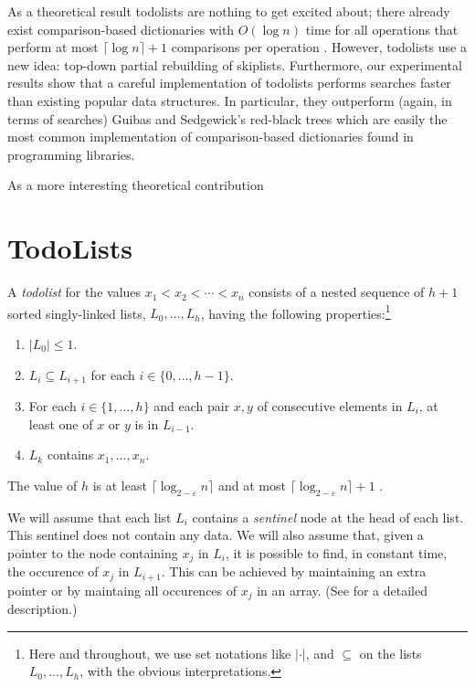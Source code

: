 \documentclass[lotsofwhite]{patmorin}
\begin{document}
As a theoretical result todolists are nothing to get excited about; there
already exist comparison-based dictionaries with $O(\log n)$ time for
all operations that perform at most $\lceil\log n\rceil+1$ comparisons
per operation \cite{S}. However, todolists use a new idea: top-down
partial rebuilding of skiplists.  Furthermore, our experimental results
show that a careful implementation of todolists performs searches faster
than existing popular data structures.  In particular, they outperform
(again, in terms of searches) Guibas and Sedgewick's red-black trees
which are easily the most common implementation of comparison-based
dictionaries found in programming libraries.

As a more interesting theoretical contribution



\section{TodoLists}

A \emph{todolist} for the values $x_1<x_2<\cdots<x_n$ consists of a
nested sequence of $h+1$ sorted singly-linked lists, $L_0,\ldots,L_h$,
having the following properties:\footnote{Here and throughout, we use set
notations like $|\cdot|$, and $\subseteq$ on the lists $L_0,\ldots,L_h$,
with the obvious interpretations.}

\begin{enumerate}
\item $|L_0| \le 1$.
\item $L_i\subseteq L_{i+1}$ for each $i\in\{0,\ldots,h-1\}$.
\item For each $i\in\{1,\ldots,h\}$ and each pair $x,y$ of consecutive elements in $L_i$, at least one of $x$ or $y$ is in $L_{i-1}$.
\item $L_k$ contains $x_1,\ldots,x_n$.
\end{enumerate}

The value of $h$ is at least $\lceil \log_{2-\varepsilon} n\rceil$ and at most
$\lceil \log_{2-\varepsilon} n\rceil+1$ .

We will assume that each list $L_i$ contains a \emph{sentinel} node
at the head of each list. This sentinel does not contain any data.
We will also assume that, given a pointer to the node containing $x_j$
in $L_i$, it is possible to find, in constant time, the occurence of $x_j$
in $L_{i+1}$.  This can be achieved by maintaining an extra pointer or by
maintaing all occurences of $x_j$ in an array. (See 
for a detailed description.)
\end{document}
